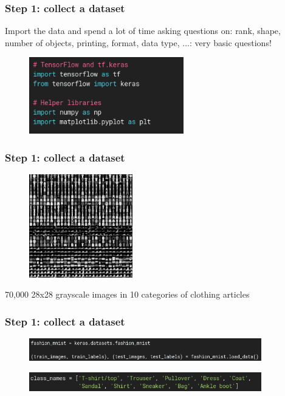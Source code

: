 \begin{frame}
	\frametitle{Step 1: collect a dataset}

	Import the data and spend a lot of time asking questions on: rank, shape, number of objects, printing, format, data type, ...: very basic questions!


	 \begin{figure}
                \includegraphics[width=0.6\textwidth]{Pics/tf_1.png}
        \end{figure}
	
\end{frame}

\begin{frame}
        \frametitle{Step 1: collect a dataset}

         \begin{figure}
                \includegraphics[width=0.4\textwidth]{Pics/fashion-mnist.png}
        \end{figure}

	\small{70,000 28x28 grayscale images in 10 categories of clothing articles}

\end{frame}

\begin{frame}
        \frametitle{Step 1: collect a dataset}

         \begin{figure}
                \includegraphics[width=0.9\textwidth]{Pics/tf_2.png}
        \end{figure}

	 \begin{figure}
                \includegraphics[width=0.9\textwidth]{Pics/tf_3.png}
        \end{figure}

\end{frame}

